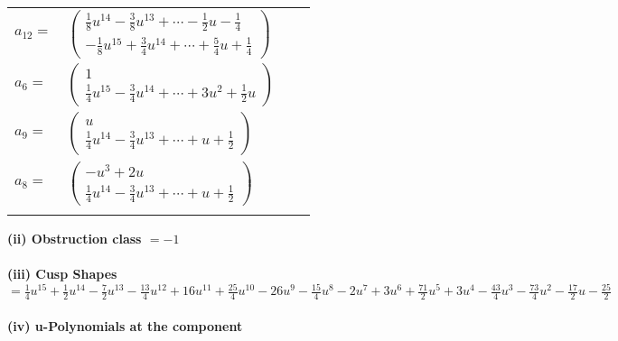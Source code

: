 \documentclass[1p]{elsarticle_modified}
\theoremstyle{definition}
\begin{document}
\begin{tabular}{m{7pt} m{180pt} m{7pt} m{180pt} }
\flushright $a_{12}=$&$\begin{pmatrix}\frac{1}{8} u^{14}-\frac{3}{8} u^{13}+\cdots-\frac{1}{2} u-\frac{1}{4}\\-\frac{1}{8} u^{15}+\frac{3}{4} u^{14}+\cdots+\frac{5}{4} u+\frac{1}{4}\end{pmatrix}$ \\
\flushright $a_{6}=$&$\begin{pmatrix}1\\\frac{1}{4} u^{15}-\frac{3}{4} u^{14}+\cdots+3 u^2+\frac{1}{2} u\end{pmatrix}$ \\
\flushright $a_{9}=$&$\begin{pmatrix}u\\\frac{1}{4} u^{14}-\frac{3}{4} u^{13}+\cdots+u+\frac{1}{2}\end{pmatrix}$ \\
\flushright $a_{8}=$&$\begin{pmatrix}- u^3+2 u\\\frac{1}{4} u^{14}-\frac{3}{4} u^{13}+\cdots+u+\frac{1}{2}\end{pmatrix}$\\&\end{tabular}
\flushleft \textbf{(ii) Obstruction class $= -1$}\\~\\
\flushleft \textbf{(iii) Cusp Shapes $= \frac{1}{4} u^{15}+\frac{1}{2} u^{14}-\frac{7}{2} u^{13}-\frac{13}{4} u^{12}+16 u^{11}+\frac{25}{4} u^{10}-26 u^9-\frac{15}{4} u^8-2 u^7+3 u^6+\frac{71}{2} u^5+3 u^4-\frac{43}{4} u^3-\frac{73}{4} u^2-\frac{17}{2} u-\frac{25}{2}$}\\~\\
\newpage\renewcommand{\arraystretch}{1}
\flushleft \textbf{(iv) u-Polynomials at the component}\newline \\
\end{document}
